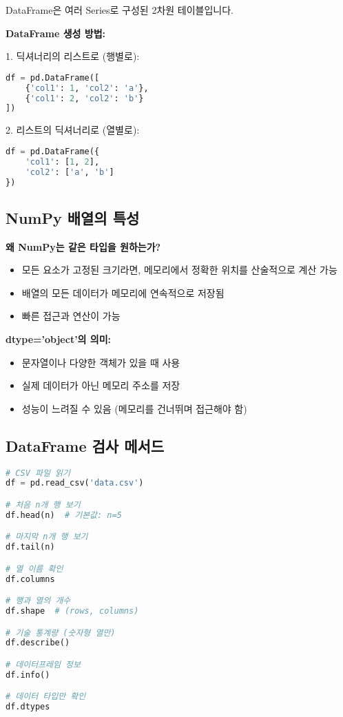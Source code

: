 \documentclass[12pt,a4paper]{article}
\begin{document}
DataFrame은 여러 Series로 구성된 2차원 테이블입니다.

\textbf{DataFrame 생성 방법:}

1. 딕셔너리의 리스트로 (행별로):
\begin{lstlisting}[language=Python]
df = pd.DataFrame([
    {'col1': 1, 'col2': 'a'},
    {'col1': 2, 'col2': 'b'}
])
\end{lstlisting}

2. 리스트의 딕셔너리로 (열별로):
\begin{lstlisting}[language=Python]
df = pd.DataFrame({
    'col1': [1, 2],
    'col2': ['a', 'b']
})
\end{lstlisting}

\subsection{NumPy 배열의 특성}

\textbf{왜 NumPy는 같은 타입을 원하는가?}

\begin{itemize}
    \item 모든 요소가 고정된 크기라면, 메모리에서 정확한 위치를 산술적으로 계산 가능
    \item 배열의 모든 데이터가 메모리에 연속적으로 저장됨
    \item 빠른 접근과 연산이 가능
\end{itemize}

\textbf{dtype='object'의 의미:}
\begin{itemize}
    \item 문자열이나 다양한 객체가 있을 때 사용
    \item 실제 데이터가 아닌 메모리 주소를 저장
    \item 성능이 느려질 수 있음 (메모리를 건너뛰며 접근해야 함)
\end{itemize}

\subsection{DataFrame 검사 메서드}

\begin{lstlisting}[language=Python]
# CSV 파일 읽기
df = pd.read_csv('data.csv')

# 처음 n개 행 보기
df.head(n)  # 기본값: n=5

# 마지막 n개 행 보기
df.tail(n)

# 열 이름 확인
df.columns

# 행과 열의 개수
df.shape  # (rows, columns)

# 기술 통계량 (숫자형 열만)
df.describe()

# 데이터프레임 정보
df.info()

# 데이터 타입만 확인
df.dtypes
\end{lstlisting}
\end{document}
